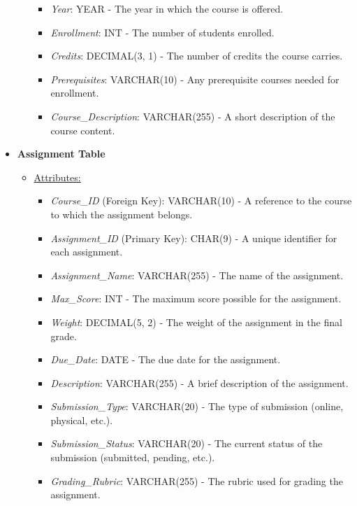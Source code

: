 \documentclass[12pt]{article}
\begin{document}
\begin{itemize}
\begin{itemize}
\begin{itemize}
            \item \textit{Year}: YEAR - The year in which the course is offered.
            \item \textit{Enrollment}: INT - The number of students enrolled.
            \item \textit{Credits}: DECIMAL(3, 1) - The number of credits the course carries.
            \item \textit{Prerequisites}: VARCHAR(10) - Any prerequisite courses needed for enrollment.
            \item \textit{Course\_Description}: VARCHAR(255) - A short description of the course content.
        \end{itemize}
    \end{itemize}
    
    \item \textbf{Assignment Table}
    \begin{itemize}
        \item \underline{Attributes:}
        \begin{itemize}
            \item \textit{Course\_ID} (Foreign Key): VARCHAR(10) - A reference to the course to which the assignment belongs.
            \item \textit{Assignment\_ID} (Primary Key): CHAR(9) - A unique identifier for each assignment.
            \item \textit{Assignment\_Name}: VARCHAR(255) - The name of the assignment.
            \item \textit{Max\_Score}: INT - The maximum score possible for the assignment.
            \item \textit{Weight}: DECIMAL(5, 2) - The weight of the assignment in the final grade.
            \item \textit{Due\_Date}: DATE - The due date for the assignment.
            \item \textit{Description}: VARCHAR(255) - A brief description of the assignment.
            \item \textit{Submission\_Type}: VARCHAR(20) - The type of submission (online, physical, etc.).
            \item \textit{Submission\_Status}: VARCHAR(20) - The current status of the submission (submitted, pending, etc.).
            \item \textit{Grading\_Rubric}: VARCHAR(255) - The rubric used for grading the assignment.
        \end{itemize}
    \end{itemize}
\pagebreak
    

\end{itemize}
\end{document}
